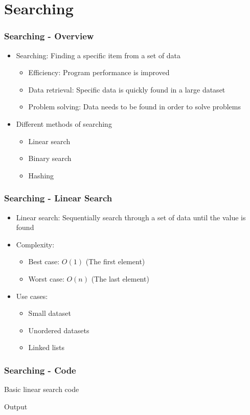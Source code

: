 \documentclass[c, aspectratio=169]{beamer}
\begin{document}
\section{Searching}
\begin{frame}\frametitle{Searching - Overview}
\begin{itemize}
\item Searching: Finding a specific item from a set of data
	\begin{itemize}
	\item Efficiency: Program performance is improved
	\item Data retrieval: Specific data is quickly found in a large dataset
	\item Problem solving: Data needs to be found in order to solve problems
	\end{itemize}
\item Different methods of searching
	\begin{itemize}
	\item Linear search
	\item Binary search
	\item Hashing
	\end{itemize}
\end{itemize}
\end{frame}

\begin{frame}\frametitle{Searching - Linear Search}
\begin{itemize}
\item Linear search: Sequentially search through a set of data until the value is found
\item Complexity:
	\begin{itemize}
	\item Best case: $O(1)$ (The first element)
	\item Worst case: $O(n)$ (The last element)
	\end{itemize}
\item Use cases:
	\begin{itemize}
	\item Small dataset
	\item Unordered datasets
	\item Linked lists
	\end{itemize}
\end{itemize}
\end{frame}

\begin{frame}\frametitle{Searching - Code}
Basic linear search code


Output

\end{frame}
\end{document}
